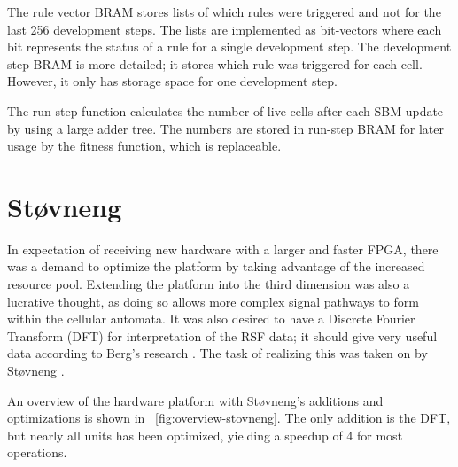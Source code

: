 The rule vector BRAM stores lists of which rules were triggered and not for the last 256 development steps.
The lists are implemented as bit-vectors where each bit represents the status of a rule for a single development step.
The development step BRAM is more detailed; it stores which rule was triggered for each cell.
However, it only has storage space for one development step.

The run-step function calculates the number of live cells after each SBM update by using a large adder tree.
The numbers are stored in run-step BRAM for later usage by the fitness function, which is replaceable.


\section{Støvneng}

In expectation of receiving new hardware with a larger and faster FPGA, there was a demand to optimize the platform by taking advantage of the increased resource pool.
Extending the platform into the third dimension was also a lucrative thought, as doing so allows more complex signal pathways to form within the cellular automata.
It was also desired to have a Discrete Fourier Transform (DFT) for interpretation of the RSF data; it should give very useful data according to Berg's research \cite{berg2013ca}.
The task of realizing this was taken on by Støvneng \cite{stovneng2014sblock}.

An overview of the hardware platform with Støvneng's additions and optimizations is shown in \figurename~\ref{fig:overview-stovneng}.
The only addition is the DFT, but nearly all units has been optimized, yielding a speedup of 4 for most operations.

